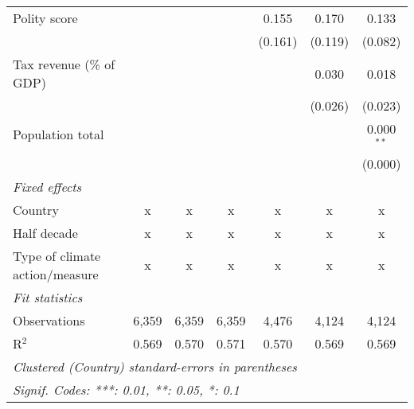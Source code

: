 \begin{tabular}{lcccccc}
   Polity score                                                   &              &                &                & 0.155          & 0.170          & 0.133\\   
                                                                  &              &                &                & (0.161)        & (0.119)        & (0.082)\\   
   Tax revenue (\% of GDP)                                        &              &                &                &                & 0.030          & 0.018\\   
                                                                  &              &                &                &                & (0.026)        & (0.023)\\   
   Population total                                               &              &                &                &                &                & 0.000$^{**}$\\   
                                                                  &              &                &                &                &                & (0.000)\\   
   \emph{Fixed effects}\\
   Country                                                        & x            & x              & x              & x              & x              & x\\  
   Half decade                                                    & x            & x              & x              & x              & x              & x\\  
   Type of climate action/measure                                 & x            & x              & x              & x              & x              & x\\  
   \midrule \emph{Fit statistics}\\
   Observations                                                   & 6,359        & 6,359          & 6,359          & 4,476          & 4,124          & 4,124\\  
   R$^2$                                                          & 0.569        & 0.570          & 0.571          & 0.570          & 0.569          & 0.569\\  
   \midrule
   \multicolumn{7}{l}{\emph{Clustered (Country) standard-errors in parentheses}}\\
   \multicolumn{7}{l}{\emph{Signif. Codes: ***: 0.01, **: 0.05, *: 0.1}}\\
\end{tabular}
\par\endgroup


